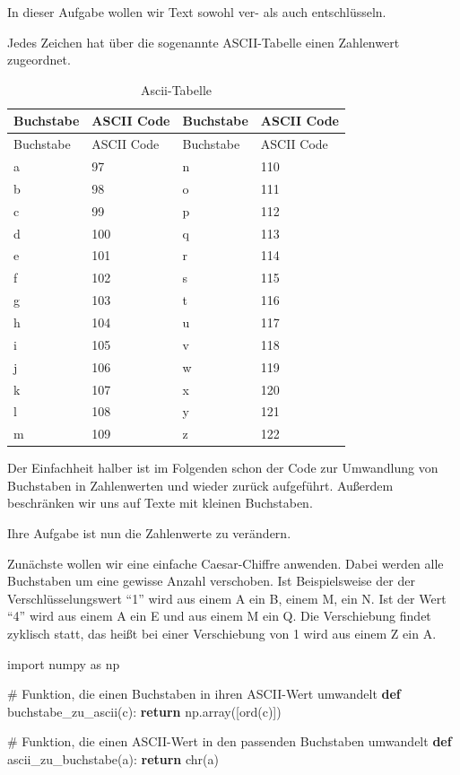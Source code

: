 \documentclass[
  letterpaper,
  DIV=11,
  numbers=noendperiod]{scrreprt}
\newenvironment{Shaded}{\begin{snugshade}}{\end{snugshade}}
\newcommand{\BuiltInTok}[1]{\textcolor[rgb]{0.00,0.23,0.31}{#1}}
\newcommand{\CommentTok}[1]{\textcolor[rgb]{0.37,0.37,0.37}{#1}}
\newcommand{\ControlFlowTok}[1]{\textcolor[rgb]{0.00,0.23,0.31}{\textbf{#1}}}
\newcommand{\ImportTok}[1]{\textcolor[rgb]{0.00,0.46,0.62}{#1}}
\newcommand{\KeywordTok}[1]{\textcolor[rgb]{0.00,0.23,0.31}{\textbf{#1}}}
\newcommand{\NormalTok}[1]{\textcolor[rgb]{0.00,0.23,0.31}{#1}}
\begin{document}
In dieser Aufgabe wollen wir Text sowohl ver- als auch entschlüsseln.

Jedes Zeichen hat über die sogenannte ASCII-Tabelle einen Zahlenwert
zugeordnet.

\begin{longtable}[]{@{}llll@{}}
\caption{Ascii-Tabelle}\label{tbl-ascii}\tabularnewline
\toprule\noalign{}
Buchstabe & ASCII Code & Buchstabe & ASCII Code \\
\midrule\noalign{}
\endfirsthead
\toprule\noalign{}
Buchstabe & ASCII Code & Buchstabe & ASCII Code \\
\midrule\noalign{}
\endhead
\bottomrule\noalign{}
\endlastfoot
a & 97 & n & 110 \\
b & 98 & o & 111 \\
c & 99 & p & 112 \\
d & 100 & q & 113 \\
e & 101 & r & 114 \\
f & 102 & s & 115 \\
g & 103 & t & 116 \\
h & 104 & u & 117 \\
i & 105 & v & 118 \\
j & 106 & w & 119 \\
k & 107 & x & 120 \\
l & 108 & y & 121 \\
m & 109 & z & 122 \\
\end{longtable}

Der Einfachheit halber ist im Folgenden schon der Code zur Umwandlung
von Buchstaben in Zahlenwerten und wieder zurück aufgeführt. Außerdem
beschränken wir uns auf Texte mit kleinen Buchstaben.

Ihre Aufgabe ist nun die Zahlenwerte zu verändern.

Zunächste wollen wir eine einfache Caesar-Chiffre anwenden. Dabei werden
alle Buchstaben um eine gewisse Anzahl verschoben. Ist Beispielsweise
der der Verschlüsselungswert ``1'' wird aus einem A ein B, einem M, ein
N. Ist der Wert ``4'' wird aus einem A ein E und aus einem M ein Q. Die
Verschiebung findet zyklisch statt, das heißt bei einer Verschiebung von
1 wird aus einem Z ein A.

\begin{Shaded}
\begin{Highlighting}[]
\ImportTok{import}\NormalTok{ numpy }\ImportTok{as}\NormalTok{ np}

\CommentTok{\# Funktion, die einen Buchstaben in ihren ASCII{-}Wert umwandelt}
\KeywordTok{def}\NormalTok{ buchstabe\_zu\_ascii(c):}
    \ControlFlowTok{return}\NormalTok{ np.array([}\BuiltInTok{ord}\NormalTok{(c)])}

\CommentTok{\# Funktion, die einen ASCII{-}Wert in den passenden Buchstaben umwandelt}
\KeywordTok{def}\NormalTok{ ascii\_zu\_buchstabe(a):}
    \ControlFlowTok{return} \BuiltInTok{chr}\NormalTok{(a)}
\end{Highlighting}
\end{Shaded}
\end{document}
